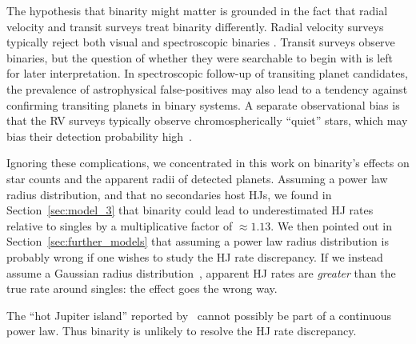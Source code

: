 \documentclass[12pt,modern]{aastex61}
\begin{document}
The hypothesis that binarity might matter is grounded in the fact that radial 
velocity and transit surveys treat binarity differently.
Radial velocity surveys typically reject both visual and spectroscopic binaries
\citep[\textit{e.g.},][]{wright_frequency_2012}.
Transit surveys observe binaries, but the question of whether they 
were searchable to begin with is left for later interpretation.
In spectroscopic follow-up of transiting planet candidates, the prevalence of 
astrophysical false-positives may also lead to a tendency against confirming 
transiting planets in binary systems.
A separate observational bias is that the RV surveys typically observe 
chromospherically ``quiet'' stars, which may bias their detection probability 
high~\citep{bastien_radial_2014}.

Ignoring these complications, we concentrated in this work on binarity's 
effects on star counts and the apparent radii of detected planets.
Assuming a power law radius distribution, and that no secondaries host HJs,
we found in Section~\ref{sec:model_3} that binarity 
could lead to underestimated HJ rates relative to singles by a multiplicative 
factor of $\approx 1.13$.
We then pointed out in Section~\ref{sec:further_models} that assuming a 
power law radius distribution is probably wrong if one wishes to study the HJ 
rate discrepancy.
If we instead assume a Gaussian radius 
distribution~\citep[following][]{petigura_CKS_2017}, apparent 
HJ rates are {\it greater} than the true rate around singles: the effect goes 
the wrong way.

The ``hot Jupiter island'' reported by~\citet{petigura_CKS_2017} cannot 
possibly be part of a continuous power law. 
Thus binarity is unlikely to resolve the HJ rate discrepancy.
\end{document}
